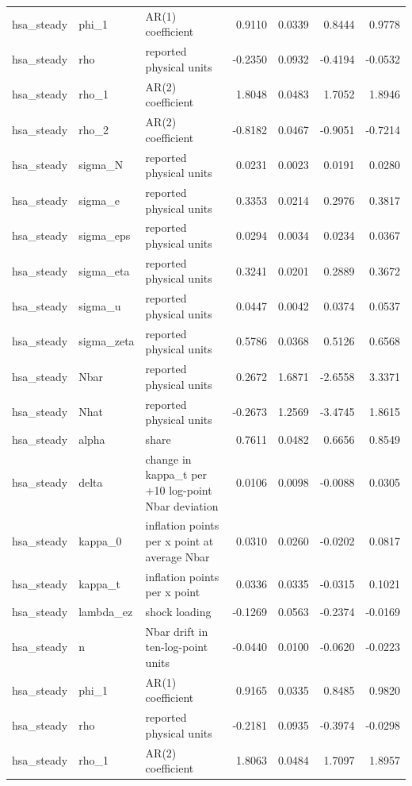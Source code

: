 \begin{tabular}{lllrrrr}
hsa\_steady & phi\_1 & AR(1) coefficient & 0.9110 & 0.0339 & 0.8444 & 0.9778 \\
hsa\_steady & rho & reported physical units & -0.2350 & 0.0932 & -0.4194 & -0.0532 \\
hsa\_steady & rho\_1 & AR(2) coefficient & 1.8048 & 0.0483 & 1.7052 & 1.8946 \\
hsa\_steady & rho\_2 & AR(2) coefficient & -0.8182 & 0.0467 & -0.9051 & -0.7214 \\
hsa\_steady & sigma\_N & reported physical units & 0.0231 & 0.0023 & 0.0191 & 0.0280 \\
hsa\_steady & sigma\_e & reported physical units & 0.3353 & 0.0214 & 0.2976 & 0.3817 \\
hsa\_steady & sigma\_eps & reported physical units & 0.0294 & 0.0034 & 0.0234 & 0.0367 \\
hsa\_steady & sigma\_eta & reported physical units & 0.3241 & 0.0201 & 0.2889 & 0.3672 \\
hsa\_steady & sigma\_u & reported physical units & 0.0447 & 0.0042 & 0.0374 & 0.0537 \\
hsa\_steady & sigma\_zeta & reported physical units & 0.5786 & 0.0368 & 0.5126 & 0.6568 \\
hsa\_steady & Nbar & reported physical units & 0.2672 & 1.6871 & -2.6558 & 3.3371 \\
hsa\_steady & Nhat & reported physical units & -0.2673 & 1.2569 & -3.4745 & 1.8615 \\
hsa\_steady & alpha & share & 0.7611 & 0.0482 & 0.6656 & 0.8549 \\
hsa\_steady & delta & change in kappa\_t per +10 log-point Nbar deviation & 0.0106 & 0.0098 & -0.0088 & 0.0305 \\
hsa\_steady & kappa\_0 & inflation points per x point at average Nbar & 0.0310 & 0.0260 & -0.0202 & 0.0817 \\
hsa\_steady & kappa\_t & inflation points per x point & 0.0336 & 0.0335 & -0.0315 & 0.1021 \\
hsa\_steady & lambda\_ez & shock loading & -0.1269 & 0.0563 & -0.2374 & -0.0169 \\
hsa\_steady & n & Nbar drift in ten-log-point units & -0.0440 & 0.0100 & -0.0620 & -0.0223 \\
hsa\_steady & phi\_1 & AR(1) coefficient & 0.9165 & 0.0335 & 0.8485 & 0.9820 \\
hsa\_steady & rho & reported physical units & -0.2181 & 0.0935 & -0.3974 & -0.0298 \\
hsa\_steady & rho\_1 & AR(2) coefficient & 1.8063 & 0.0484 & 1.7097 & 1.8957 \\

\end{tabular}

